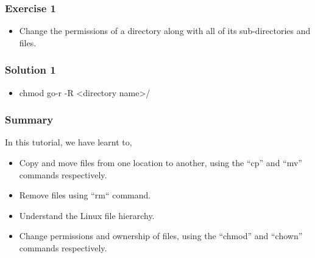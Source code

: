 \documentclass[12pt,compress]{beamer}
\begin{document}
\begin{frame}
  \frametitle{Exercise 1}
  \begin{itemize}
  \item Change the permissions of a directory along with all of its
        sub-directories and files.
  \end{itemize}
\end{frame}

\begin{frame}
  \frametitle{Solution 1}
  \begin{itemize}
  \item chmod go-r -R <directory name>/
  \end{itemize}
\end{frame}

\begin{frame}
\frametitle{Summary}
\label{sec-8}

  In this tutorial, we have learnt to,


\begin{itemize}
\item Copy and move files from one location to another, using the ``cp'' 
      and ``mv'' commands respectively.
\item Remove files using ``rm`` command.
\item Understand the Linux file hierarchy.
\item Change permissions and ownership of files, using the ``chmod''
      and ``chown'' commands respectively.
\end{itemize}
\end{frame}
\end{document}
